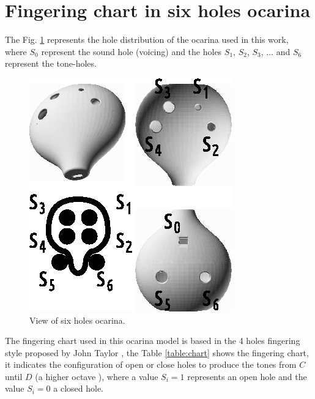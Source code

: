 \documentclass[11pt,twocolumn]{article}
\begin{document}
\section{Fingering chart in six holes ocarina}
The Fig. \ref{fig:ocarinaview} represents the hole distribution of the ocarina
used in this work, where $S_0$ represent the sound hole (voicing)
and the holes $S_1$, $S_2$, $S_3$, ... and $S_6$ represent the tone-holes.
\begin{figure}[ht!]
\centering
\includegraphics[width=0.750\columnwidth]{ocarina-view.eps}
\caption{View of six holes ocarina. }
\label{fig:ocarinaview}
\end{figure}
The fingering chart used in this ocarina model is based in the 
4 holes fingering style proposed by John Taylor \cite[pp. 79, 146]{metropolitan1985american}, the
Table \ref{table:chart} shows the fingering chart, it indicates the configuration of open or close holes
to produce the tones from $C$ until $D$ (a higher octave ), where a value $S_i=1$ represents an
open hole and the value $S_i=0$ a closed hole.
\end{document}
